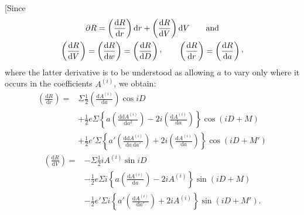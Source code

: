 [Since
\[
\begin{gathered}
\partial R=\left(\frac{\mathrm{d}R}{\mathrm{d}r}\right)\mathrm{d}r+\left(\frac{\mathrm{d}R}{\mathrm{d}V}\right)\mathrm{d}V\qquad\text{and}\\
\left(\frac{\mathrm{d}R}{\mathrm{d}V}\right)=\left(\frac{\mathrm{d}R}{\mathrm{d}w}\right)=\left(\frac{\mathrm{d}R}{\mathrm{d}D}\right)\text{\raisebox{.45ex}{,}}\qquad
\left(\frac{\mathrm{d}R}{\mathrm{d}r}\right)=\left(\frac{\mathrm{d}R}{\mathrm{d}a}\right)\text{\raisebox{.45ex}{,}}
\end{gathered}
\]
\noindent where the latter derivative is to be understood as allowing \(a\) to vary only where it occurs in the coefficients \(A^{(i)}\), we obtain:
\[
\begin{aligned}
\left(\frac{\mathrm{d}R}{\mathrm{d}r}\right)={}&\Sigma\tfrac12\left(\frac{\mathrm{d}A^{(i)}}{\mathrm{d}a}\right)\cos iD\\
&+\tfrac12 e\Sigma\left\{a\left(\frac{\mathrm{d}\mathrm{d}A^{(i)}}{\mathrm{d}a^2}\right)-2i\left(\frac{\mathrm{d}A^{(i)}}{\mathrm{d}a}\right)\right\}\cos(iD+M)\\
&+\tfrac12 e'\Sigma\left\{a'\left(\frac{\mathrm{d}\mathrm{d}A^{(i)}}{\mathrm{d}a\,\mathrm{d}a'}\right)+2i\left(\frac{\mathrm{d}A^{(i)}}{\mathrm{d}a}\right)\right\}\cos(iD+M')
\end{aligned}
\]
\[
\begin{aligned}
\left(\frac{\mathrm{d}R}{\mathrm{d}V}\right)={}&-\Sigma\tfrac12 iA^{(i)}\sin iD\\
&-\tfrac12 e\Sigma i\left\{a\left(\frac{\mathrm{d}A^{(i)}}{\mathrm{d}a}\right)-2iA^{(i)}\right\}\sin(iD+M)\\
&-\tfrac12 e'\Sigma i\left\{a'\left(\frac{\mathrm{d}A^{(i)}}{\mathrm{d}a'}\right)+2iA^{(i)}\right\}\sin(iD+M').
\end{aligned}
\]

